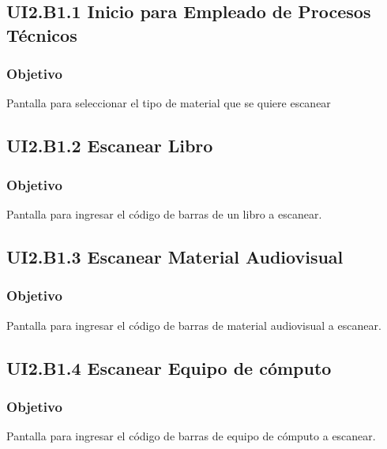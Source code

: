 \newpage
\subsection{UI2.B1.1 Inicio para Empleado de Procesos Técnicos}

\subsubsection{Objetivo}
	Pantalla para seleccionar el tipo de material que se quiere escanear



\subsection{UI2.B1.2 Escanear Libro}

\subsubsection{Objetivo}
	Pantalla para ingresar el código de barras de un libro a escanear.


\subsection{UI2.B1.3 Escanear Material Audiovisual}

\subsubsection{Objetivo}
	Pantalla para ingresar el código de barras de material audiovisual a escanear.


\subsection{UI2.B1.4 Escanear Equipo de cómputo}

\subsubsection{Objetivo}
	Pantalla para ingresar el código de barras de equipo de cómputo a escanear.

